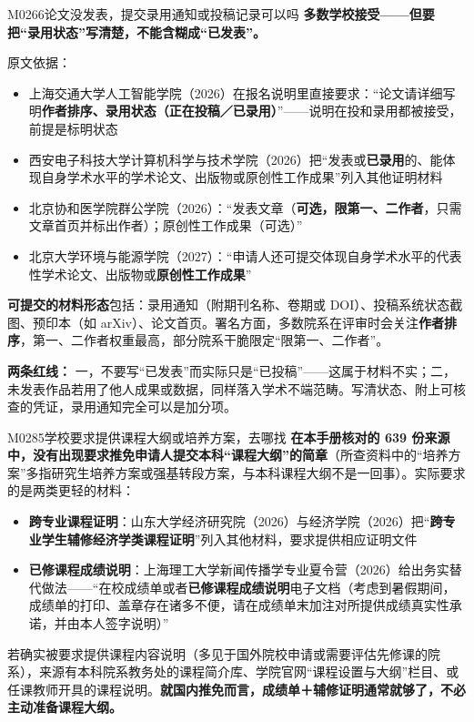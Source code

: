 \begin{qa}{M0266}{论文没发表，提交录用通知或投稿记录可以吗}
\textbf{多数学校接受——但要把“录用状态”写清楚，不能含糊成“已发表”。}

原文依据：

\begin{itemize}
  \item 上海交通大学人工智能学院（2026）在报名说明里直接要求：“论文请详细写明\textbf{作者排序、录用状态（正在投稿／已录用）}”——说明在投和录用都被接受，前提是标明状态
  \item 西安电子科技大学计算机科学与技术学院（2026）把“发表或\textbf{已录用}的、能体现自身学术水平的学术论文、出版物或原创性工作成果”列入其他证明材料
  \item 北京协和医学院群公学院（2026）：“发表文章（\textbf{可选，限第一、二作者}，只需文章首页并标出作者）；原创性工作成果（可选）”
  \item 北京大学环境与能源学院（2027）：“申请人还可提交体现自身学术水平的代表性学术论文、出版物或\textbf{原创性工作成果}”
\end{itemize}

\textbf{可提交的材料形态}包括：录用通知（附期刊名称、卷期或 DOI）、投稿系统状态截图、预印本（如 arXiv）、论文首页。署名方面，多数院系在评审时会关注\textbf{作者排序}，第一、二作者权重最高，部分院系干脆限定“限第一、二作者”。

\textbf{两条红线：} 一，不要写“已发表”而实际只是“已投稿”——这属于材料不实；二，未发表作品若用了他人成果或数据，同样落入学术不端范畴。写清状态、附上可核查的凭证，录用通知完全可以是加分项。
\end{qa}

\begin{qa}{M0285}{学校要求提供课程大纲或培养方案，去哪找}
\textbf{在本手册核对的 639 份来源中，没有出现要求推免申请人提交本科“课程大纲”的简章}（所查资料中的“培养方案”多指研究生培养方案或强基转段方案，与本科课程大纲不是一回事）。实际要求的是两类更轻的材料：

\begin{itemize}
  \item \textbf{跨专业课程证明}：山东大学经济研究院（2026）与经济学院（2026）把“\textbf{跨专业学生辅修经济学类课程证明}”列入其他材料，要求提供相应证明文件
  \item \textbf{已修课程成绩说明}：上海理工大学新闻传播学专业夏令营（2026）给出务实替代做法——“在校成绩单或者\textbf{已修课程成绩说明}电子文档（考虑到暑假期间，成绩单的打印、盖章存在诸多不便，请在成绩单末加注对所提供成绩真实性承诺，并由本人签字说明）”
\end{itemize}

若确实被要求提供课程内容说明（多见于国外院校申请或需要评估先修课的院系），来源有本科院系教务处的课程简介库、学院官网“课程设置与大纲”栏目、或任课教师开具的课程说明。\textbf{就国内推免而言，成绩单＋辅修证明通常就够了，不必主动准备课程大纲。}
\end{qa}


